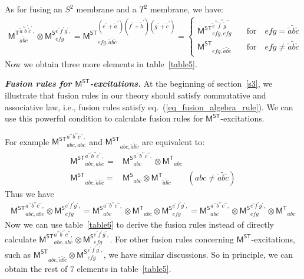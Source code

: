 \documentclass[11pt,nofootinbib,preprint]{revtex4-1}
\begin{document}
As for fusing an $S^2$ membrane and a $T^2$ membrane, we have:
\begin{align}
	\mathsf{M^T}_{\tilde{a}\tilde{b}\tilde{c}}^{\tilde{a}^{\prime}\tilde{b}^{\prime}\tilde{c}^{\prime},}\otimes \mathsf{M^S}_{efg}^{e^{\prime}f^{\prime}g^{\prime},}=\mathsf{M^{ST}}_{efg,\tilde{a}\tilde{b}\tilde{c}}^{\left( e^{\prime}+\tilde{a}^{\prime} \right) \left( f^{\prime}+\tilde{b}^{\prime} \right) \left( g^{\prime}+\tilde{c}^{\prime} \right)}=\begin{cases}
		\mathsf{M^{ST}}_{efg,efg}^{\tilde{e}^{\prime \prime}\tilde{f}^{\prime \prime}\tilde{g}^{\prime \prime}}&\quad\text{for}\quad efg=\tilde{a}\tilde{b}\tilde{c}\\
		\mathsf{M^{ST}}_{efg,\tilde{a}\tilde{b}\tilde{c}}&\quad\text{for}\quad efg\ne \tilde{a}\tilde{b}\tilde{c}
	\end{cases}
\end{align}
Now we obtain three more elements in table~\ref{table5}.

\textbf{\textit{Fusion rules for $\mathsf{M^{ST}}$-excitations.}}
At the beginning of section~\ref{s3}, we illustrate that fusion rules in our theory should satisfy commutative and associative law, i.e., fusion rules satisfy eq.~(\ref{eq_fusion_algebra_rule}). We can use this powerful condition to calculate fusion rules for $\mathsf{M^{ST}}$-excitations. 

For example $\mathsf{M^{ST}}_{abc,abc}^{a^{\prime\prime}b^{\prime\prime}c^{\prime\prime},}$ and $\mathsf{M^{ST}}_{abc,\tilde{a}\tilde{b}\tilde{c}}$ are equivalent to:
\begin{align}
	\mathsf{M^{ST}}_{abc,abc}^{a^{\prime\prime}b^{\prime\prime}c^{\prime\prime},}=&\mathsf{M^S}_{abc}^{a^{\prime\prime}b^{\prime\prime}c^{\prime\prime},}\otimes \mathsf{M^T}_{abc}
	\\
	\mathsf{M^{ST}}_{abc,\tilde{a}\tilde{b}\tilde{c}}=&\mathsf{M^S}_{abc}\otimes \mathsf{M^T}_{\tilde{a}\tilde{b}\tilde{c}} \qquad \left(abc\ne\tilde{a}\tilde{b}\tilde{c}\right)
\end{align}
Thus we have 
\begin{align}
	\mathsf{M^{ST}}_{abc,abc}^{a^{\prime\prime}b^{\prime\prime}c^{\prime\prime},}\otimes \mathsf{M^S}_{efg}^{e^{\prime}f^{\prime}g^{\prime},}=\mathsf{M^S}_{abc}^{a^{\prime\prime}b^{\prime\prime}c^{\prime\prime},}\otimes \mathsf{M^T}_{abc}\otimes \mathsf{M^S}_{efg}^{e^{\prime}f^{\prime}g^{\prime},}=\mathsf{M^S}_{abc}^{a^{\prime\prime}b^{\prime\prime}c^{\prime\prime},}\otimes \mathsf{M^S}_{efg}^{e^{\prime}f^{\prime}g^{\prime},}\otimes \mathsf{M^T}_{abc}
\end{align}
Now we can use table~\ref{table6} to derive the fusion rules instead of directly calculate $\mathsf{M^{ST}}_{abc,abc}^{a^{\prime\prime}b^{\prime\prime}c^{\prime\prime},}\otimes \mathsf{M^S}_{efg}^{e^{\prime}f^{\prime}g^{\prime},}$. For other fusion rules concerning $\mathsf{M^{ST}}$-excitations, such as $\mathsf{M^{ST}}_{abc,\tilde{a}\tilde{b}\tilde{c}}\otimes \mathsf{M^S}_{efg}^{e^{\prime}f^{\prime}g^{\prime},}$, we have similar discussions. So in principle, we can obtain the rest of $7$ elements in table~\ref{table5}.
\end{document}

